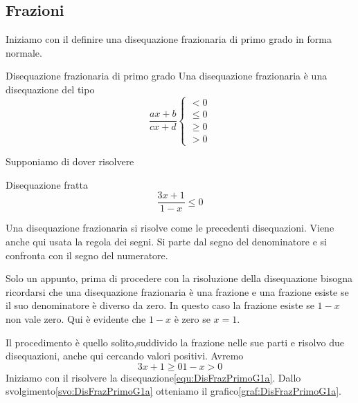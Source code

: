\subsection{Frazioni}
Iniziamo con il definire una disequazione frazionaria di primo grado in forma normale.
\begin{definizionet}{Disequazione frazionaria di primo grado}{}
Una disequazione frazionaria è una disequazione del tipo 
\begin{equation}
\dfrac{ax+b}{cx+d}\left\{ \begin{aligned}
<0\\
\leq 0\\
\geq 0\\
>0
\end{aligned}\right .   
\end{equation}
\end{definizionet}
Supponiamo di dover risolvere
\begin{esempiot}{Disequazione fratta}{}
 \begin{equation}
\dfrac{3x+1}{1-x}\leq 0\label{equ:DisFrazPrimoG1}
\end{equation}
\end{esempiot}
Una disequazione frazionaria si risolve come le precedenti disequazioni. Viene anche qui usata la regola dei segni. Si parte dal segno del denominatore e si confronta con il segno del numeratore.\par Solo un appunto, prima di procedere con la risoluzione della disequazione bisogna ricordarsi che una disequazione frazionaria è una frazione  e una frazione esiste se il suo denominatore è diverso da zero. In questo caso la frazione esiste se $1-x$ non vale zero. Qui è evidente che $1-x$ è zero se $x=1$.\par Il procedimento è quello solito,suddivido la frazione nelle sue parti e risolvo due disequazioni, anche qui cercando valori positivi. Avremo
\begin{subequations}
	\begin{equation}
	3x+1\geq 0\label{equ:DisFrazPrimoG1a} 
	\end{equation}
\begin{equation}
1-x> 0\label{equ:DisFrazPrimoG1b} 
\end{equation}
\end{subequations}   
Iniziamo con il risolvere la disequazione\nobs\vref{equ:DisFrazPrimoG1a}. Dallo svolgimento\nobs\vref{svo:DisFrazPrimoG1a} otteniamo il grafico\nobs\vref{graf:DisFrazPrimoG1a}. 
